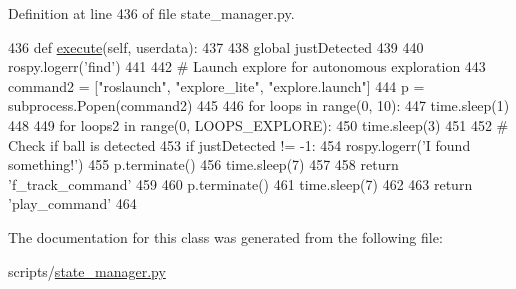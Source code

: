Definition at line 436 of file state\+\_\+manager.\+py.


\begin{DoxyCode}
436     \textcolor{keyword}{def }\hyperlink{classstate__manager_1_1MIRO__Find_a05ade27a9bfa1ad11e210be4373ff4a9}{execute}(self, userdata):
437 
438         \textcolor{keyword}{global} justDetected
439 
440         rospy.logerr(\textcolor{stringliteral}{'find'})
441 
442         \textcolor{comment}{# Launch explore for autonomous exploration}
443         command2 = [\textcolor{stringliteral}{"roslaunch"}, \textcolor{stringliteral}{"explore\_lite"}, \textcolor{stringliteral}{"explore.launch"}]
444         p = subprocess.Popen(command2)
445 
446         \textcolor{keywordflow}{for} loops \textcolor{keywordflow}{in} range(0, 10):
447             time.sleep(1)
448 
449             \textcolor{keywordflow}{for} loops2 \textcolor{keywordflow}{in} range(0, LOOPS\_EXPLORE):
450                 time.sleep(3)
451 
452                 \textcolor{comment}{# Check if ball is detected}
453                 \textcolor{keywordflow}{if} justDetected != -1:
454                     rospy.logerr(\textcolor{stringliteral}{'I found something!'})
455                     p.terminate()
456                     time.sleep(7)
457 
458                     \textcolor{keywordflow}{return} \textcolor{stringliteral}{'f\_track\_command'}
459 
460         p.terminate()
461         time.sleep(7)
462 
463         \textcolor{keywordflow}{return} \textcolor{stringliteral}{'play\_command'}
464 
\end{DoxyCode}


The documentation for this class was generated from the following file\+:\begin{DoxyCompactItemize}
\item 
scripts/\hyperlink{state__manager_8py}{state\+\_\+manager.\+py}\end{DoxyCompactItemize}
